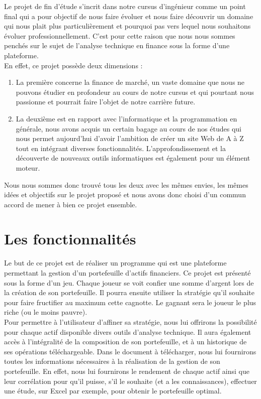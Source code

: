 Le projet de fin d'étude s'incrit dans notre cursus d'ingénieur comme un point final qui a pour objectif de nous faire évoluer et nous faire découvrir un domaine qui nous plait plus particulièrement et pourquoi pas vers lequel nous souhaitons évoluer professionnellement. C'est pour cette raison que nous nous sommes penchés sur le sujet de l'analyse technique en finance sous la forme d'une plateforme.\\

En effet, ce projet possède deux dimensions :
\begin{enumerate}
 \item La première concerne la finance de marché, un vaste domaine que nous ne pouvons étudier en profondeur au cours de notre cursus et qui pourtant nous passionne et pourrait faire l'objet de notre carrière future.
 \item La deuxième est en rapport avec l'informatique et la programmation en générale, nous avons acquis un certain bagage au cours de nos études qui nous permet aujourd'hui d'avoir l'ambition de créer un site Web de A à Z tout en intégrant diverses fonctionnalités. L'approfondissement et la découverte de nouveaux outils informatiques est également pour un élément moteur.
\end{enumerate}

Nous nous sommes donc trouvé tous les deux avec les mêmes envies, les mêmes idées et objectifs sur le projet proposé et nous avons donc choisi d'un commun accord de mener à bien ce projet ensemble.


\section{Les fonctionnalités}
Le but de ce projet est de réaliser un programme qui est une plateforme permettant la gestion d'un portefeuille d'actifs financiers. Ce projet est présenté sous la forme d'un jeu. Chaque joueur se voit confier une somme d'argent lors de la création de son portefeuille. Il pourra ensuite utiliser la stratégie qu'il souhaite pour faire fructifier au maximum cette cagnotte. Le gagnant sera le joueur le plus riche (ou le moins pauvre).\\

Pour permettre à l'utilisateur d'affiner sa stratégie, nous lui offrirons la possibilité pour chaque actif disponible divers outils d’analyse technique. Il aura également accès à l'intégralité de la composition de son portefeuille, et à un historique de ses opérations téléchargeable. Dans le document à télécharger, nous lui fournirons toutes les informations nécessaires à la réalisation de la gestion de son portefeuille. En effet, nous lui fournirons le rendement de chaque actif ainsi que leur corrélation pour qu'il puisse, s'il le souhaite (et a les connaissances), effectuer une étude, sur Excel par exemple, pour obtenir le portefeuille optimal.\\

